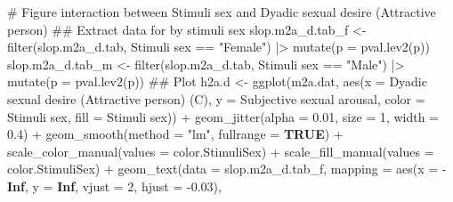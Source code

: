 \documentclass[
  bookmarksnumbered]{article}
\newenvironment{Shaded}{\begin{snugshade}}{\end{snugshade}}
\newcommand{\AttributeTok}[1]{\textcolor[rgb]{0.80,0.80,0.80}{#1}}
\newcommand{\CommentTok}[1]{\textcolor[rgb]{0.50,0.62,0.50}{#1}}
\newcommand{\ConstantTok}[1]{\textcolor[rgb]{0.86,0.64,0.64}{\textbf{#1}}}
\newcommand{\DecValTok}[1]{\textcolor[rgb]{0.86,0.86,0.80}{#1}}
\newcommand{\DocumentationTok}[1]{\textcolor[rgb]{0.50,0.62,0.50}{#1}}
\newcommand{\FloatTok}[1]{\textcolor[rgb]{0.75,0.75,0.82}{#1}}
\newcommand{\FunctionTok}[1]{\textcolor[rgb]{0.94,0.94,0.56}{#1}}
\newcommand{\NormalTok}[1]{\textcolor[rgb]{0.80,0.80,0.80}{#1}}
\newcommand{\OtherTok}[1]{\textcolor[rgb]{0.94,0.94,0.56}{#1}}
\newcommand{\SpecialCharTok}[1]{\textcolor[rgb]{0.86,0.64,0.64}{#1}}
\newcommand{\StringTok}[1]{\textcolor[rgb]{0.80,0.58,0.58}{#1}}
\begin{document}
\begin{Shaded}
\begin{Highlighting}[]
\CommentTok{\# Figure interaction between Stimuli sex and Dyadic sexual desire (Attractive person)}
\DocumentationTok{\#\# Extract data for by stimuli sex}
\NormalTok{slop.m2a\_d.tab\_f }\OtherTok{\textless{}{-}} \FunctionTok{filter}\NormalTok{(slop.m2a\_d.tab, }\StringTok{\textasciigrave{}}\AttributeTok{Stimuli sex}\StringTok{\textasciigrave{}} \SpecialCharTok{==} \StringTok{"Female"}\NormalTok{) }\SpecialCharTok{|\textgreater{}}
  \FunctionTok{mutate}\NormalTok{(}\AttributeTok{p =} \FunctionTok{pval.lev2}\NormalTok{(p))}
\NormalTok{slop.m2a\_d.tab\_m }\OtherTok{\textless{}{-}} \FunctionTok{filter}\NormalTok{(slop.m2a\_d.tab, }\StringTok{\textasciigrave{}}\AttributeTok{Stimuli sex}\StringTok{\textasciigrave{}} \SpecialCharTok{==} \StringTok{"Male"}\NormalTok{) }\SpecialCharTok{|\textgreater{}}
  \FunctionTok{mutate}\NormalTok{(}\AttributeTok{p =} \FunctionTok{pval.lev2}\NormalTok{(p))}
\DocumentationTok{\#\# Plot}
\NormalTok{h2a.d }\OtherTok{\textless{}{-}} \FunctionTok{ggplot}\NormalTok{(m2a.dat, }\FunctionTok{aes}\NormalTok{(}\AttributeTok{x =} \StringTok{\textasciigrave{}}\AttributeTok{Dyadic sexual desire (Attractive person) (C)}\StringTok{\textasciigrave{}}\NormalTok{,}
                             \AttributeTok{y =} \StringTok{\textasciigrave{}}\AttributeTok{Subjective sexual arousal}\StringTok{\textasciigrave{}}\NormalTok{,}
                             \AttributeTok{color =} \StringTok{\textasciigrave{}}\AttributeTok{Stimuli sex}\StringTok{\textasciigrave{}}\NormalTok{, }\AttributeTok{fill =} \StringTok{\textasciigrave{}}\AttributeTok{Stimuli sex}\StringTok{\textasciigrave{}}\NormalTok{)) }\SpecialCharTok{+}
  \FunctionTok{geom\_jitter}\NormalTok{(}\AttributeTok{alpha =} \FloatTok{0.01}\NormalTok{, }\AttributeTok{size =} \DecValTok{1}\NormalTok{, }\AttributeTok{width =} \FloatTok{0.4}\NormalTok{) }\SpecialCharTok{+}
  \FunctionTok{geom\_smooth}\NormalTok{(}\AttributeTok{method =} \StringTok{"lm"}\NormalTok{, }\AttributeTok{fullrange =} \ConstantTok{TRUE}\NormalTok{) }\SpecialCharTok{+}
  \FunctionTok{scale\_color\_manual}\NormalTok{(}\AttributeTok{values =}\NormalTok{ color.StimuliSex) }\SpecialCharTok{+}
  \FunctionTok{scale\_fill\_manual}\NormalTok{(}\AttributeTok{values =}\NormalTok{ color.StimuliSex) }\SpecialCharTok{+}
  \FunctionTok{geom\_text}\NormalTok{(}\AttributeTok{data =}\NormalTok{ slop.m2a\_d.tab\_f,}
            \AttributeTok{mapping =} \FunctionTok{aes}\NormalTok{(}\AttributeTok{x =} \SpecialCharTok{{-}}\ConstantTok{Inf}\NormalTok{, }\AttributeTok{y =} \ConstantTok{Inf}\NormalTok{,}
            \AttributeTok{vjust =} \DecValTok{2}\NormalTok{, }\AttributeTok{hjust =} \SpecialCharTok{{-}}\FloatTok{0.03}\NormalTok{),}

\end{Highlighting}
\end{Shaded}
\end{document}
